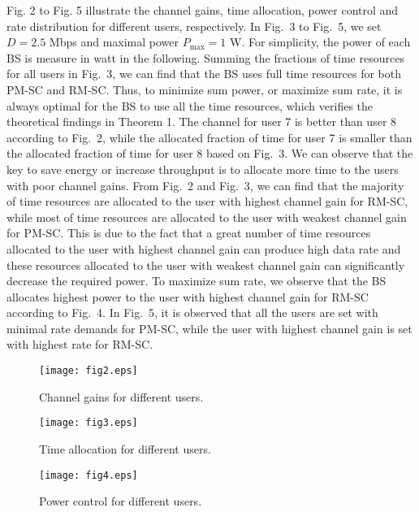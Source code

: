 \documentclass[journal]{IEEEtran}
\begin{document}
Fig. 2 to Fig. 5 illustrate the channel gains, time allocation, power control and rate distribution for different users, respectively.
In Fig.~3 to Fig.~5, we set $D=2.5$ Mbps and maximal power $P_{\max}=1$ W.
For simplicity, the power of each BS is measure in watt in the following.
Summing the fractions of time resources for all users in Fig.~3, we can find that the BS uses full time resources for both PM-SC and RM-SC.
Thus, to minimize sum power, or maximize sum rate, it is always optimal for the BS to use all the time resources, which verifies the theoretical findings in Theorem 1.
The channel for user 7 is better than user 8 according to Fig.~2, while the allocated fraction of time for user 7 is smaller than the allocated fraction of time for user 8 based on Fig.~3.
We can observe that the key to save energy or increase throughput is to allocate more time to the users with poor channel gains.
From Fig.~2 and Fig.~3, we can find that the majority of time resources are allocated to the user with highest channel gain for RM-SC, while most of time resources are allocated to the user with weakest channel gain for PM-SC.
This is due to the fact that a great number of time resources allocated to the user with highest channel gain can produce high data rate and these resources allocated to the user with weakest channel gain can significantly decrease the required power.
To maximize sum rate, we observe that the BS allocates highest power to the user with highest channel gain for RM-SC according to Fig.~4.
In Fig.~5, it is observed that all the users are set with minimal rate demands for PM-SC, while the user with highest channel gain is set with highest rate for  RM-SC.

\begin{figure}
\centering
\texttt{[image: fig2.eps]}
\vspace{-1em}
\caption{Channel gains for different users.\label{fig6}}
\vspace{-1em}
\end{figure}

\begin{figure}
\centering
\texttt{[image: fig3.eps]}
\vspace{-1em}
\caption{Time allocation for different users.\label{fig3}}
\vspace{-1em}
\end{figure}

\begin{figure}
\centering
\texttt{[image: fig4.eps]}
\vspace{-1em}
\caption{Power control for different users.\label{fig4}}
\end{figure}
\end{document}
